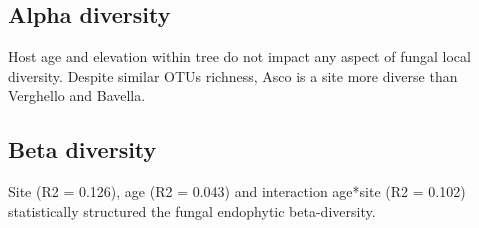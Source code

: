 \documentclass[12pt]{article}\usepackage[]{graphicx}\usepackage[]{color}
\numberwithin{figure}{section}
\begin{document}
  \subsection{Alpha diversity}

Host age and elevation within tree do not impact any aspect of fungal local diversity. Despite similar OTUs richness, Asco is a site more diverse than Verghello and Bavella.

  \subsection{Beta diversity}

Site (R2 = 0.126), age (R2 = 0.043) and interaction age*site (R2 = 0.102) statistically structured the fungal endophytic beta-diversity. 


\cleardoublepage
\listoffigures
\listoftables
\end{document}

